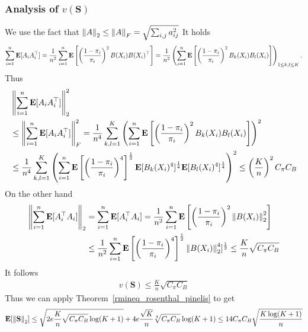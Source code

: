 \subsubsection*{Analysis of $v(\mathbf{S})$}
We use the fact that 
$
  \left\lVert A\right\rVert_2 
  \le
  \left\lVert A\right\rVert_F
  =
  \sqrt{
    \sum_{i,j}^{}
    a_{ij}^2
  }
$
It holds
\begin{gather}
  \sum_{i=1}^{n}
  \mathbf{E}[A_iA_i^\top]
  =
  \frac{1}{n^2}
  \sum_{i=1}^{n}
  \mathbf{E}
  \left[ 
    \left( 
      \frac{1-\pi_i}{\pi_i}
    \right)^2
    B(X_i)B(X_i)^\top
  \right]
  =
  \frac{1}{n^2}
  \left( 
    \sum_{i=1}^{n}
    \mathbf{E}
    \left[ 
    \left( 
      \frac{1-\pi_i}{\pi_i}
    \right)^2
    B_k(X_i)B_l(X_i)
    \right]
  \right)
  _{1\le k,l \le K}
  .
\end{gather}
Thus
\begin{align}
  \begin{split}
  &\left\lVert
  \sum_{i=1}^{n}
  \mathbf{E}[A_iA_i^\top]
  \right\rVert_2^2
  \\
  &\le
  \left\lVert
  \sum_{i=1}^{n}
  \mathbf{E}[A_iA_i^\top]
  \right\rVert_F^2
  =
  \frac{1}{n^4}
  \sum_{k,l=1}^{K}
  \left( 
    \sum_{i=1}^{n}
    \mathbf{E}
    \left[ 
    \left( 
      \frac{1-\pi_i}{\pi_i}
    \right)^2
    B_k(X_i)B_l(X_i)
    \right]
  \right)^2
  \\
  &\le
  \frac{1}{n^4}
  \sum_{k,l=1}^{K}
  \left( 
    \sum_{i=1}^{n}
    \mathbf{E}
    \left[ 
    \left( 
      \frac{1-\pi_i}{\pi_i}
    \right)^4
    \right]
    ^\frac{1}{2}
    \mathbf{E}[
    B_k(X_i)^4
    ]^\frac{1}{4}
    \mathbf{E}[
    B_l(X_i)^4
    ]^\frac{1}{4}
  \right)^2
  \le
  \left(
  \frac{K}{n}
  \right)^2
  C_\pi C_B
  \end{split}
\end{align}
On the other hand
\begin{align}
  \begin{split}
  \left\lVert
  \sum_{i=1}^{n}
  \mathbf{E}[A^\top_iA_i]
  \right\rVert_2
  &=
  \sum_{i=1}^{n}
  \mathbf{E}[A^\top_iA_i]
  =
  \frac{1}{n^2}
    \sum_{i=1}^{n}
    \mathbf{E}
    \left[ 
    \left( 
      \frac{1-\pi_i}{\pi_i}
    \right)^2
    \left\lVert B(X_i)\right\rVert_2^2
    \right]
    \\
    &\le
  \frac{1}{n^2}
    \sum_{i=1}^{n}
    \mathbf{E}
    \left[ 
    \left( 
      \frac{1-\pi_i}{\pi_i}
    \right)^4
    \right]^\frac{1}{2}
    \left\lVert B(X_i)\right\rVert_2^4
    ]^\frac{1}{2}
    \le
    \frac{K}{n}\sqrt{
  C_\pi C_B
    }
  \end{split}
\end{align}
It follows
\begin{gather}
  v(\mathbf{S})
  \le
    \frac{K}{n}\sqrt{
  C_\pi C_B
  }
\end{gather}
Thus we can apply Theorem~\ref{rmineq_rosenthal_pinelis}
to get
\begin{gather}
  \mathbf{E}[\left\lVert\mathbf{S}\right\rVert_2]
  \le
  \sqrt{
    2e 
    \frac{K}{n}\sqrt{
  C_\pi C_B
  }
  \log
  (K+1)
  }
  +
  4e
  \frac{\sqrt{K}}{n}
  \sqrt[4]{
  C_\pi C_B
  }
  \log
  (K+1)
  \le
  14
  C_\pi C_B
  \sqrt{
    \frac{K \log(K+1)}{n}
  }
\end{gather}
